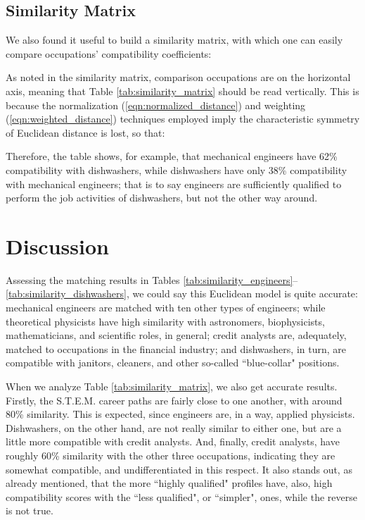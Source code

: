\documentclass{article}
\begin{document}
\subsection{Similarity Matrix}
We also found it useful to build a similarity matrix, with which one can easily compare occupations' compatibility coefficients:
\SimilarityMatrix

As noted in the similarity matrix, comparison occupations are on the horizontal axis, meaning that Table \ref{tab:similarity_matrix} should be read vertically. This is because the normalization (\ref{eqn:normalized_distance}) and weighting (\ref{eqn:weighted_distance}) techniques employed imply the characteristic symmetry of Euclidean distance is lost, so that:
\SimilarityAsymmetry

Therefore, the table shows, for example, that mechanical engineers have 62\% compatibility with dishwashers, while dishwashers have only 38\% compatibility with mechanical engineers; that is to say engineers are sufficiently qualified to perform the job activities of dishwashers, but not the other way around.

\section{Discussion}
Assessing the matching results in Tables \ref{tab:similarity_engineers}--\ref{tab:similarity_dishwashers}, we could say this Euclidean model is quite accurate: mechanical engineers are matched with ten other types of engineers; while theoretical physicists have high similarity with astronomers, biophysicists, mathematicians, and scientific roles, in general; credit analysts are, adequately, matched to occupations in the financial industry; and dishwashers, in turn, are compatible with janitors, cleaners, and other so-called ``blue-collar" positions.

When we analyze Table \ref{tab:similarity_matrix}, we also get accurate results. Firstly, the S.T.E.M. career paths are fairly close to one another, with around 80\% similarity. This is expected, since engineers are, in a way, applied physicists. Dishwashers, on the other hand, are not really similar to either one, but are a little more compatible with credit analysts. And, finally, credit analysts, have roughly 60\% similarity with the other three occupations, indicating they are somewhat compatible, and undifferentiated in this respect. It also stands out, as already mentioned, that the more ``highly qualified" profiles have, also, high compatibility scores with the ``less qualified", or ``simpler", ones, while the reverse is not true.
\end{document}

